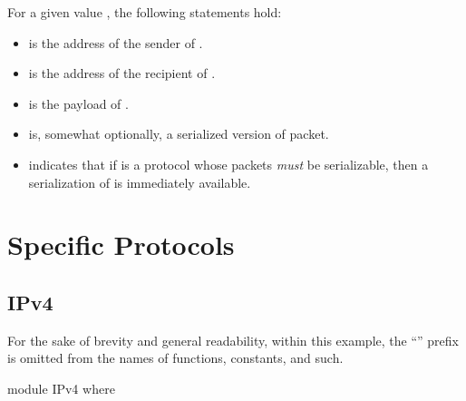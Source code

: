 \documentclass{report}
\begin{document}
\begin{itemize}
For a given   value , the following statements hold:
\begin{itemize}
	\item {}  is the address of the sender of .
	\item {}  is the address of the recipient of .
	\item {}  is the payload of .
	\item {}  is, somewhat optionally, a serialized version of packet.
	\item {}  indicates that if  is a protocol whose packets \emph{must} be serializable, then a serialization of  is immediately available.
\end{itemize}

\part{Specific Protocols}

\chapter{IPv4}
For the sake of brevity and general readability, within this example, the ``'' prefix is omitted from the names of functions, constants, and such.

\begin{code}
module IPv4 where
\end{code}


\end{itemize}
\end{document}
